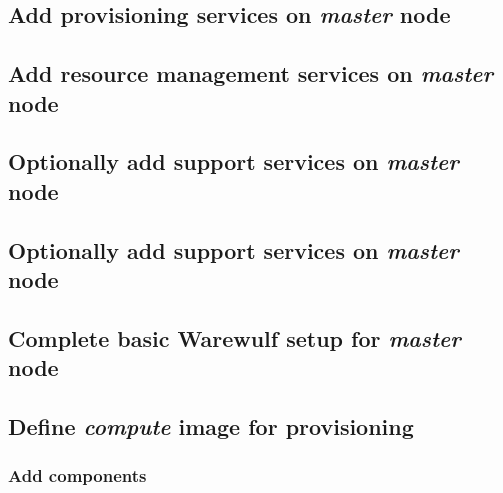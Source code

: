 \documentclass[letterpaper]{article}
\begin{document}
\subsection{Add provisioning services on {\em master} node} \label{sec:add_provisioning}




\vspace*{0.15cm}
\subsection{Add resource management services on {\em master} node} \label{sec:add_rm}


\subsection{Optionally add \InfiniBand{} support services on {\em master} node} \label{sec:add_ofed}


\subsection{Optionally add \OmniPath{} support services on {\em master} node} \label{sec:add_opa}


\vspace*{-0.15cm}
\subsection{Complete basic Warewulf setup for {\em master} node} \label{sec:setup_ww}




\subsection{Define {\em compute} image for provisioning}


\subsubsection{Add \OHPC{} components} \label{sec:add_components}

\end{document}
